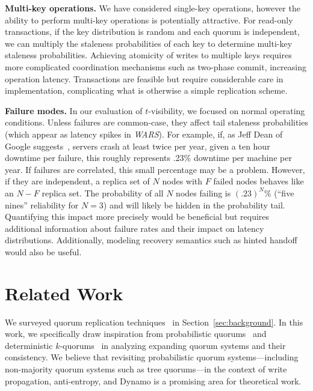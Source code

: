 \documentclass{vldb}
\newcommand{\sectionskip}{-0em}
\begin{document}
\textbf{Multi-key operations.} We have considered single-key
operations, however the ability to perform multi-key operations is
potentially attractive.  For read-only transactions, if the key
distribution is random and each quorum is independent, we can multiply
the staleness probabilities of each key to determine multi-key
staleness probabilities. Achieving atomicity of writes to multiple
keys requires more complicated coordination mechanisms such as
two-phase commit, increasing operation latency.  Transactions are
feasible but require considerable care in implementation, complicating
what is otherwise a simple replication scheme.

\textbf{Failure modes.} In our evaluation of $t$-visibility, we
focused on normal operating conditions. Unless failures are
common-case, they affect tail staleness probabilities (which appear as
latency spikes in \textit{WARS}).  For example, if, as Jeff Dean of
Google suggests~\cite{dean-keynote}, servers crash at least twice per
year, given a ten hour downtime per failure, this roughly represents
.23\% downtime per machine per year.  If failures are correlated, this
small percentage may be a problem. However, if they are independent, a
replica set of $N$ nodes with $F$ failed nodes behaves like an $N-F$
replica set.  The probability of all $N$ nodes failing is $(.23)^N$\%
(``five nines'' reliability for $N$$=$$3$) and will likely be hidden
in the probability tail.  Quantifying this impact more precisely would
be beneficial but requires additional information about failure rates
and their impact on latency distributions. Additionally, modeling
recovery semantics such as hinted handoff~\cite[Section 4.6]{dynamo}
would also be useful.

\vspace{\sectionskip}\section{Related Work}
\label{sec:relatedwork}

We surveyed quorum replication techniques~\cite{prob-quorum-dynamic,
  92-quorums, treequorum, non-strict, multi-k-quorum, quorums-start,
  quorum-placement, partitionedquorum, quorums-alternative,
  prob-quorum, quorum-overview, quorumsystems} in
Section~\ref{sec:background}.  In this work, we specifically draw
inspiration from probabilistic quorums~\cite{prob-quorum} and
deterministic $k$-quorums~\cite{ non-strict, multi-k-quorum} in
analyzing expanding quorum systems and their consistency.  We believe
that revisiting probabilistic quorum systems---including non-majority
quorum systems such as tree quorums---in the context of write
propagation, anti-entropy, and Dynamo is a promising area for
theoretical work.
\end{document}
